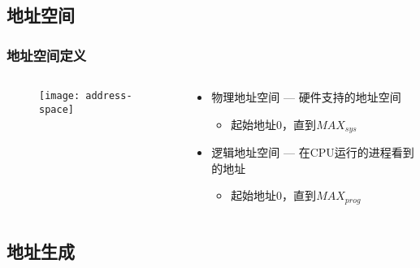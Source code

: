 \subsection{地址空间} %
\begin{frame}[plain,t]
    \frametitle{地址空间定义}
    \begin{columns}
        \begin{column}{0.4\textwidth}
		    \begin{figure}
		        \centering
		        \texttt{[image: address-space]}
		    \end{figure}
        \end{column}
        \begin{column}{0.6\textwidth}
			\begin{itemize}
			    \item 物理地址空间 — 硬件支持的地址空间
			    \begin{itemize}
				    \item 起始地址0，直到\begin{math}MAX_{sys}\end{math}
			    \end{itemize}
			    \item 逻辑地址空间 — 在CPU运行的进程看到的地址
			    \begin{itemize}
			        \item 起始地址0，直到\begin{math}MAX_{prog}\end{math}
			    \end{itemize}
			\end{itemize}
        \end{column}
    \end{columns}
\end{frame}

\subsection{地址生成} %

